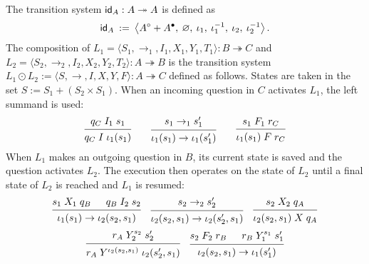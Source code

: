 \begin{definition}
  The transition system
  $ \mathsf{id} _A : A \twoheadrightarrow A$
  is defined as
  \[
     \mathsf{id} _A \::=\:
    \big\langle
    A^\circ + A^\bullet, \:
    \varnothing, \:
    \iota_1, \:
    \iota_1^{-1}, \:
    \iota_2, \:
    \iota_2^{-1}
    \big\rangle
    \,.
  \]
  The composition of
  $
  L_1 = \langle S_1, {\rightarrow_1}, I_1, X_1, Y_1, T_1 \rangle
  : B \twoheadrightarrow C
  $ and $
  L_2 = \langle S_2, {\rightarrow_2}, I_2, X_2, Y_2, T_2 \rangle
  : A \twoheadrightarrow B
  $
  is the transition system
  $
  L_1 \odot L_2 :=
  \langle S, {\rightarrow}, I, X, Y, F \rangle
  : A \twoheadrightarrow C
  $ defined as follows.
  States are taken in the set
  $
  S := S_1 + (S_2 \times S_1)
  $.
  When an incoming question in $C$ activates $L_1$,
  the left summand is used:
  \[
    \begin{prooftree}
      \hypo{q_C \mathrel{I_1} s_1}
      \infer1{q_C \mathrel{I} \iota_1(s_1)}
    \end{prooftree}
    \qquad
    \begin{prooftree}
      \hypo{s_1 \rightarrow_1 s_1'}
      \infer1{\iota_1(s_1) \rightarrow \iota_1(s_1')}
    \end{prooftree}
    \qquad
    \begin{prooftree}
      \hypo{s_1 \mathrel{F_1} r_C}
      \infer1{\iota_1(s_1) \mathrel{F} r_C}
    \end{prooftree}
  \]
  When $L_1$ makes an outgoing question in $B$,
  its current state is saved and
  the question activates $L_2$.
  The execution then
  operates on the state of $L_2$
  until a final state of $L_2$ is reached
  and $L_1$ is resumed:
  \begin{align*}
    \begin{prooftree}
      \hypo{s_1 \mathrel{X_1} q_B}
      \hypo{q_B \mathrel{I_2} s_2}
      \infer2{\iota_1(s_1) \rightarrow \iota_2(s_2, s_1)}
    \end{prooftree}
    \quad
    \begin{prooftree}
      \hypo{s_2 \rightarrow_2 s_2'}
      \infer1{\iota_2(s_2, s_1) \rightarrow \iota_2(s_2', s_1)}
    \end{prooftree}
    \quad
    \begin{prooftree}
      \hypo{s_2 \mathrel{X_2} q_A}
      \infer1{\iota_2(s_2, s_1) \mathrel{X} q_A}
    \end{prooftree}
  \end{align*}
  \vspace{-3em}
  \begin{align*}
    \begin{prooftree}
      \hypo{r_A \mathrel{Y_2^{s_2}} s_2'}
      \infer1{r_A \mathrel{Y^{\iota_2(s_2, s_1)}} \iota_2(s_2', s_1)}
    \end{prooftree}
    \quad
    \begin{prooftree}
      \hypo{s_2 \mathrel{F_2} r_B}
      \hypo{r_B \mathrel{Y_1^{s_1}} s_1'}
      \infer2{\iota_2(s_2, s_1) \rightarrow \iota_1(s_1')}
    \end{prooftree}
  \end{align*}

\end{definition}

